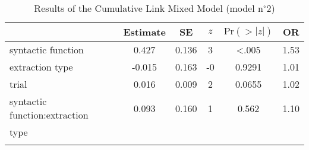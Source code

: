 \begin{table}
\begin{tabular}{l S[table-format=-1.3] S[table-format=1.3] S[table-format=-1] S[table-format=<1.4] S[table-format=1.2]}
  \lsptoprule
 & {Estimate} & {SE} & {$z$} & {$\text{Pr}(>|z|)$} & {OR} \\ 
  \midrule
  syntactic function & 0.427 & 0.136 & 3 & <.005 & 1.53 \\ 
  extraction type & -0.015 & 0.163 & -0 & 0.9291 & 1.01 \\ 
  trial & 0.016 & 0.009 & 2 & 0.0655 & 1.02 \\ 
  syntactic function:extraction  & 0.093 & 0.160 & 1 & 0.562 & 1.10 \\ 
  \quad type & \\
   \lspbottomrule
\end{tabular}
\caption{Results of the Cumulative Link Mixed Model (model n$^{\circ}$2)}
\label{tab:exp15-m2}
\end{table}
